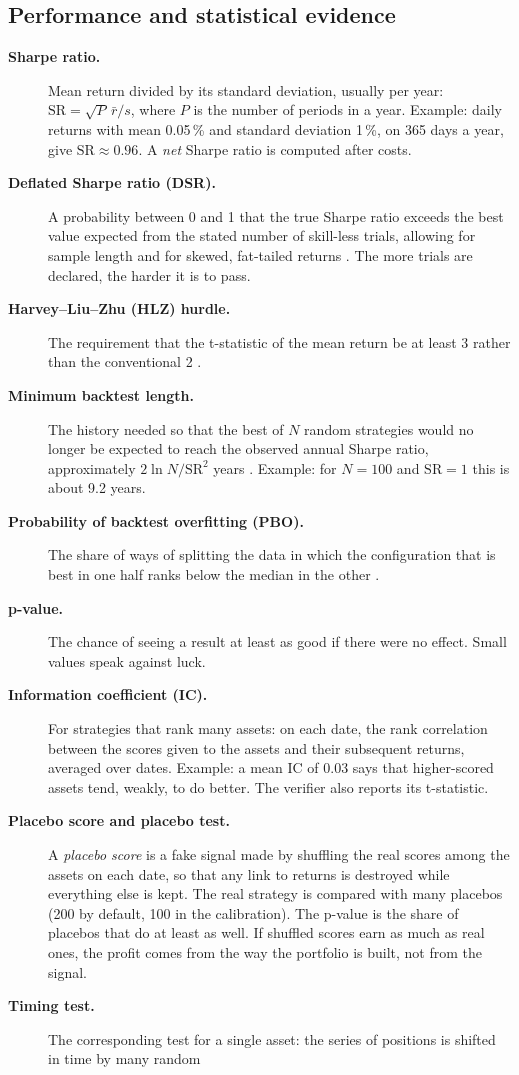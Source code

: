 \documentclass[11pt]{article}
\newcommand{\term}[1]{\item[\textbf{#1}]}
\begin{document}
\subsection{Performance and statistical evidence}

\begin{description}
\term{Sharpe ratio.} Mean return divided by its standard deviation, usually per year:
$\mathrm{SR}=\sqrt{P}\,\bar r/s$, where $P$ is the number of periods in a year. Example: daily returns with mean
0.05\,\% and standard deviation 1\,\%, on 365 days a year, give $\mathrm{SR}\approx 0.96$. A \emph{net} Sharpe ratio is
computed after costs.
\term{Deflated Sharpe ratio (DSR).} A probability between 0 and 1 that the true Sharpe ratio exceeds the best value
expected from the stated number of skill-less trials, allowing for sample length and for skewed, fat-tailed returns
\citep{bailey2014deflated}. The more trials are declared, the harder it is to pass.
\term{Harvey--Liu--Zhu (HLZ) hurdle.} The requirement that the t-statistic of the mean return be at least 3 rather
than the conventional 2 \citep{harvey2016cross}.
\term{Minimum backtest length.} The history needed so that the best of $N$ random strategies would no longer be expected
to reach the observed annual Sharpe ratio, approximately $2\ln N/\mathrm{SR}^2$ years \citep{bailey2014pseudo}. Example:
for $N=100$ and $\mathrm{SR}=1$ this is about 9.2 years.
\term{Probability of backtest overfitting (PBO).} The share of ways of splitting the data in which the configuration
that is best in one half ranks below the median in the other \citep{bailey2017pbo}.
\term{p-value.} The chance of seeing a result at least as good if there were no effect. Small values speak against luck.
\term{Information coefficient (IC).} For strategies that rank many assets: on each date, the rank correlation between
the scores given to the assets and their subsequent returns, averaged over dates. Example: a mean IC of 0.03 says that
higher-scored assets tend, weakly, to do better. The verifier also reports its t-statistic.
\term{Placebo score and placebo test.} A \emph{placebo score} is a fake signal made by shuffling the real scores among
the assets on each date, so that any link to returns is destroyed while everything else is kept. The real strategy is
compared with many placebos (200 by default, 100 in the calibration). The p-value is the share of placebos that do at
least as well. If shuffled scores earn as much as real ones, the profit comes from the way the portfolio is built, not
from the signal.
\term{Timing test.} The corresponding test for a single asset: the series of positions is shifted in time by many random

\end{description}
\end{document}
